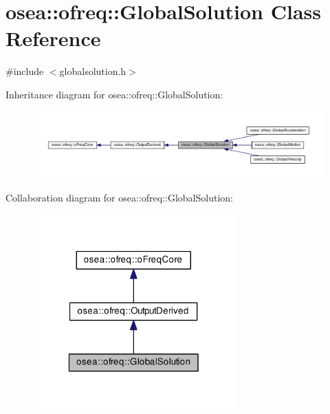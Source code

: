 \hypertarget{classosea_1_1ofreq_1_1_global_solution}{\section{osea\-:\-:ofreq\-:\-:Global\-Solution Class Reference}
\label{classosea_1_1ofreq_1_1_global_solution}
}


{\ttfamily \#include $<$globalsolution.\-h$>$}



Inheritance diagram for osea\-:\-:ofreq\-:\-:Global\-Solution\-:
\nopagebreak
\begin{figure}[H]
\begin{center}
\leavevmode
\includegraphics[width=350pt]{classosea_1_1ofreq_1_1_global_solution__inherit__graph}
\end{center}
\end{figure}


Collaboration diagram for osea\-:\-:ofreq\-:\-:Global\-Solution\-:
\nopagebreak
\begin{figure}[H]
\begin{center}
\leavevmode
\includegraphics[width=220pt]{classosea_1_1ofreq_1_1_global_solution__coll__graph}
\end{center}
\end{figure}
